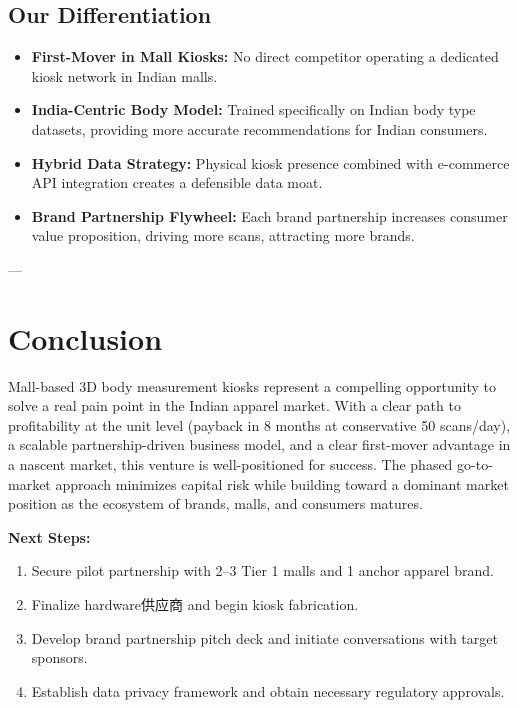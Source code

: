 \documentclass[12pt,a4paper]{article}
\begin{document}
\subsection{Our Differentiation}

\begin{itemize}
    \item \textbf{First-Mover in Mall Kiosks:} No direct competitor operating a dedicated kiosk network in Indian malls.
    \item \textbf{India-Centric Body Model:} Trained specifically on Indian body type datasets, providing more accurate recommendations for Indian consumers.
    \item \textbf{Hybrid Data Strategy:} Physical kiosk presence combined with e-commerce API integration creates a defensible data moat.
    \item \textbf{Brand Partnership Flywheel:} Each brand partnership increases consumer value proposition, driving more scans, attracting more brands.
\end{itemize}

---

\section{Conclusion}

Mall-based 3D body measurement kiosks represent a compelling opportunity to solve a real pain point in the Indian apparel market. With a clear path to profitability at the unit level (payback in 8 months at conservative 50 scans/day), a scalable partnership-driven business model, and a clear first-mover advantage in a nascent market, this venture is well-positioned for success. The phased go-to-market approach minimizes capital risk while building toward a dominant market position as the ecosystem of brands, malls, and consumers matures.

\vfill

\noindent\textbf{Next Steps:}
\begin{enumerate}
    \item Secure pilot partnership with 2--3 Tier 1 malls and 1 anchor apparel brand.
    \item Finalize hardware供应商 and begin kiosk fabrication.
    \item Develop brand partnership pitch deck and initiate conversations with target sponsors.
    \item Establish data privacy framework and obtain necessary regulatory approvals.
\end{enumerate}
\end{document}
